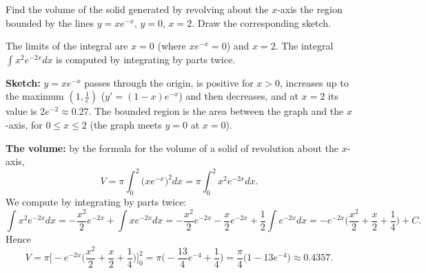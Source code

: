 
\begin{question}
Find the volume of the solid generated by revolving about the $x$-axis the region bounded by the lines $y=xe^{-x}$, $y=0$, $x=2$. Draw the corresponding sketch.
\end{question}

\begin{hint}
The limits of the integral are $x=0$ (where $xe^{-x}=0$) and $x=2$. The integral $\int x^2e^{-2x}dx$ is computed by integrating by parts twice.
\end{hint}

\begin{solution}
\textbf{Sketch:} $y=xe^{-x}$ passes through the origin, is positive for $x>0$, increases up to the maximum $(1,\frac1e)$ ($y'=(1-x)e^{-x}$) and then decreases, and at $x=2$ its value is $2e^{-2}\approx0.27$. The bounded region is the area between the graph and the $x$-axis, for $0\le x\le 2$ (the graph meets $y=0$ at $x=0$).

\textbf{The volume:} by the formula for the volume of a solid of revolution about the $x$-axis,
\[ V=\pi\int_0^2\big(xe^{-x}\big)^2dx=\pi\int_0^2x^2e^{-2x}dx . \]
We compute by integrating by parts twice:
\[ \int x^2e^{-2x}dx=-\frac{x^2}{2}e^{-2x}+\int xe^{-2x}dx=-\frac{x^2}{2}e^{-2x}-\frac{x}{2}e^{-2x}+\frac12\int e^{-2x}dx
=-e^{-2x}\Big(\frac{x^2}{2}+\frac{x}{2}+\frac14\Big)+C . \]
Hence
\[ V=\pi\Big[-e^{-2x}\Big(\frac{x^2}{2}+\frac{x}{2}+\frac14\Big)\Big]_0^2=\pi\Big(-\frac{13}{4}e^{-4}+\frac14\Big)=\boxed{\frac{\pi}{4}\big(1-13e^{-4}\big)}\approx0.4357 . \]
\end{solution}
